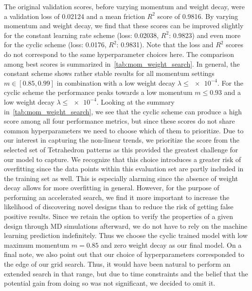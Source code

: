 The original validation scores, before varying momentum and weight decay, were a
validation loss of 0.02124 and a mean friction $R^2$ score of 0.9816. By varying
momentum and weight decay, we find that these scores can be improved slightly
for the constant learning rate scheme (loss: 0.02038, $R^2$: 0.9823) and even
more for the cyclic scheme (loss: 0.0176, $R^2$: 0.9831). Note that the loss and
$R^2$ scores do not correspond to the same hyperparameter choices here. The
comparison among best scores is summarized in~\cref{tab:mom_weight_search}. In
general, the constant scheme shows rather stable results for all momentum
settings $m \in [0.85, 0.99]$ in combination with a low weight decay $\lambda
\le \num{e-4}$. For the cyclic scheme the performance peaks towards a low
momentum $m \le 0.93$ and a low weight decay $\lambda \le \num{e-4}$. Looking at
the summary in~\cref{tab:mom_weight_search}, we see that the cyclic scheme can
produce a high score among all four performance metrics, but since these scores
do not share common hyperparameters we need to choose which of them to
prioritize. Due to our interest in capturing the non-linear trends, we
prioritize the score from the selected set of Tetrahedron patterns as this
provided the greatest challenge for our model to capture. We recognize that this
choice introduces a greater risk of overfitting since the data points within
this evaluation set are partly included in the training set as well. This is
especially alarming since the absence of weight decay allows for more
overfitting in general. However, for the purpose of performing an accelerated
search, we find it more important to increase the likelihood of discovering
novel designs than to reduce the risk of getting false positive results. Since
we retain the option to verify the properties of a given design through
\acrshort{MD} simulations afterward, we do not have to rely on the machine
learning prediction indefinitely. Thus we choose the cyclic trained model with
low maximum momentum $m = 0.85$ and zero weight decay as our final model. On a final
note, we also point out that our choice of hyperparameters corresponded to the
edge of our grid search. Thus, it would have been natural to perform an extended
search in that range, but due to time constraints and the belief that the potential gain from doing so was not significant, we decided to omit it.


